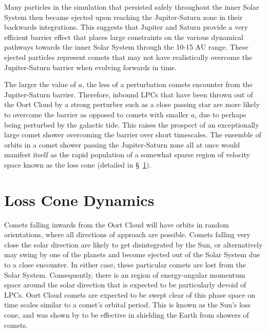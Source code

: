 Many particles in the simulation that persisted safely throughout the inner Solar System then became ejected upon reaching the Jupiter-Saturn zone in their backwards integrations. This suggests that Jupiter and Saturn provide a very efficient barrier effect that places large constraints on the various dynamical pathways towards the inner Solar System through the 10-15 AU range. These ejected particles represent comets that may not have realistically overcome the Jupiter-Saturn barrier when evolving forwards in time.

The larger the value of $a$, the less of a perturbation comets encounter from the Jupiter-Saturn barrier. Therefore, inbound LPCs that have been thrown out of the Oort Cloud by a strong perturber such as a close passing star are more likely to overcome the barrier as opposed to comets with smaller $a$, due to perhaps being perturbed by the galactic tide. This raises the prospect of an exceptionally large comet shower overcoming the barrier over short timescales. The ensemble of orbits in a comet shower passing the Jupiter-Saturn zone all at once would manifest itself as the rapid population of a somewhat sparse region of velocity space known as the loss cone (detailed in \S~\ref{sec:loss_cone}). %

\section{Loss Cone Dynamics}
\label{sec:loss_cone}

Comets falling inwards from the Oort Cloud will have orbits in random orientations, where all directions of approach are possible. Comets falling very close the solar direction are likely to get disintegrated by the Sun, or alternatively may swing by one of the planets and become ejected out of the Solar System due to a close encounter. In either case, these particular comets are lost from the Solar System. Consequently, there is an region of energy-angular momentum space around the solar direction that is expected to be particularly devoid of LPCs. Oort Cloud comets are expected to be swept clear of this phase space on time scales similar to a comet's orbital period. This is known as the Sun's loss cone, and was shown by \cite{1981AJ.....86.1730H} to be effective in shielding the Earth from showers of comets.

